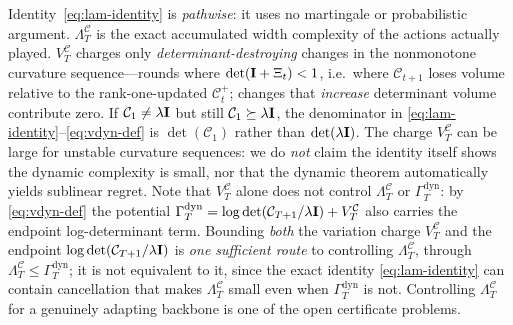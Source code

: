\documentclass[twoside]{article}
\newcommand{\Calg}{\mathcal{C}}                 %
\newcommand{\Lamalg}{\Lambda^{\Calg}}           %
\newcommand{\Valg}{V^{\Calg}}                   %
\newcommand{\Gamdyn}{\Gamma^{\mathrm{dyn}}}     %
\begin{document}
\begin{remark}
Identity~\eqref{eq:lam-identity} is \emph{pathwise}: it uses no martingale
or probabilistic argument.  $\Lamalg_T$ is the exact accumulated
width complexity of the actions actually played.  $\Valg_T$ charges
only \emph{determinant-destroying} changes in the nonmonotone curvature
sequence---rounds where $\det(\mathbf{I}+\Xi_t)<1$, i.e.\ where $\Calg_{t+1}$ loses
volume relative to the rank-one-updated $\Calg_t^{+}$; changes that
\emph{increase} determinant volume contribute zero.  If $\Calg_1\ne\lambda\bI$
but still $\Calg_1\succeq\lambda\bI$, the denominator in
\eqref{eq:lam-identity}--\eqref{eq:vdyn-def} is $\det(\Calg_1)$ rather than
$\det(\lambda\mathbf{I})$.
The charge $\Valg_T$ can be large for unstable curvature sequences: we do
\emph{not} claim the identity itself shows the dynamic complexity is small, nor
that the dynamic theorem automatically yields sublinear regret.  Note that
$\Valg_T$ alone does not control $\Lamalg_T$ or $\Gamdyn_T$: by
\eqref{eq:vdyn-def} the potential $\Gamdyn_T=\log\det(\Calg_{T+1}/\lambda\bI)
+\Valg_T$ also carries the endpoint log-determinant term.  Bounding \emph{both}
the variation charge $\Valg_T$ and the endpoint $\log\det(\Calg_{T+1}/\lambda\bI)$
is \emph{one sufficient route} to controlling $\Lamalg_T$, through
$\Lamalg_T\le\Gamdyn_T$; it is not equivalent to it, since the exact identity
\eqref{eq:lam-identity} can contain cancellation that makes $\Lamalg_T$ small even
when $\Gamdyn_T$ is not.  Controlling $\Lamalg_T$ for a genuinely adapting
backbone is one of the open certificate problems.
\end{remark}
\end{document}
